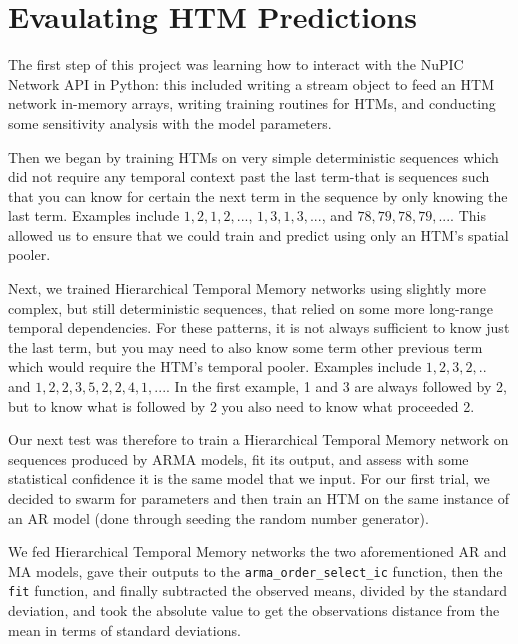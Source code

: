\documentclass[oneside,12pt,openany]{book}
\begin{document}
    
    
    
    
    \section{Evaulating HTM Predictions}\label{sec:res:eval}
    
    The first step of this project was learning how to interact with the NuPIC Network API in Python: this included writing a stream object to feed an HTM network in-memory arrays, writing training routines for HTMs, and conducting some sensitivity analysis with the model parameters. 
    
    Then we began by training HTMs on very simple deterministic sequences which did not require any temporal context past the last term-that is sequences such that you can know for certain the next term in the sequence by only knowing the last term. Examples include $1,2,1,2,...$, $1,3,1,3,...$, and $78,79,78,79,...$. This allowed us to ensure that we could train and predict using only an HTM's spatial pooler.
    
    Next, we trained Hierarchical Temporal Memory networks using slightly more complex, but still deterministic sequences, that relied on some more long-range temporal dependencies. For these patterns, it is not always sufficient to know just the last term, but you may need to also know some term other previous term which would require the HTM's temporal pooler. Examples include $1,2,3,2,..$ and $1,2,2,3,5,2,2,4,1,...$. In the first example, 1 and 3 are always followed by 2, but to know what is followed by 2 you also need to know what proceeded 2.
	
	Our next test was therefore to train a Hierarchical Temporal Memory network on sequences produced by ARMA models, fit its output, and assess with some statistical confidence it is the same model that we input. For our first trial, we decided to swarm for parameters and then train an HTM on the same instance of an AR model (done through seeding the random number generator). 
    
    
    We fed Hierarchical Temporal Memory networks the two aforementioned AR and MA models, gave their outputs to the \texttt{arma\_order\_select\_ic} function, then the \texttt{fit} function, and finally subtracted the observed means, divided by the standard deviation, and took the absolute value to get the observations distance from the mean in terms of standard deviations. 
    
\end{document}
